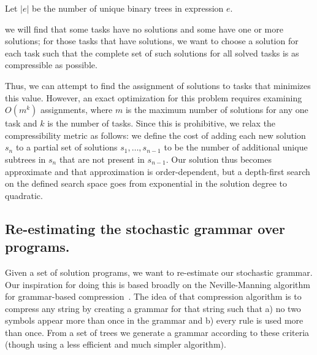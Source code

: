 \documentclass{article}
\begin{document}

Let $|e|$ be the
number of unique binary trees in expression $e$. 

we will find that some tasks have no solutions
and some have one or more solutions; for those tasks that have
solutions, we want to choose a solution for each task such that the
complete set of such solutions for all solved tasks is as compressible
as possible.


Thus, we can attempt
to find the assignment of solutions to tasks that minimizes this
value. However, an exact optimization for this problem requires
examining $O(m^k)$ assignments, where $m$ is the maximum number of
solutions for any one task and $k$ is the number of tasks. Since this
is prohibitive, we relax the compressibility metric as follows: we
define the cost of adding each new solution $s_n$ to a partial set of
solutions $s_1, \dots, s_{n-1}$ to be the number of additional unique
subtrees in $s_n$ that are not present in $s_{n-1}$. Our solution thus
becomes approximate and that approximation is order-dependent, but a
depth-first search on the defined search space goes from exponential
in the solution degree to quadratic.

\subsection{Re-estimating the stochastic grammar over programs.}

Given a set of solution programs, we want to re-estimate our
stochastic grammar. Our inspiration for doing this is based broadly on
the Neville-Manning algorithm for grammar-based
compression~\cite{nevill1997identifying}. The idea of that compression
algorithm is to compress any string by creating a grammar for that
string such that a) no two symbols appear more than once in the
grammar and b) every rule is used more than once. From a set of trees
we generate a grammar according to these criteria (though using a less
efficient and much simpler algorithm). 
\end{document}
